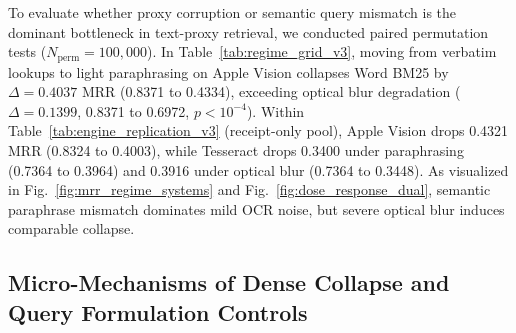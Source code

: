 To evaluate whether proxy corruption or semantic query mismatch is the dominant bottleneck in text-proxy retrieval, we conducted paired permutation tests ($N_{\text{perm}}=100{,}000$). In Table~\ref{tab:regime_grid_v3}, moving from verbatim lookups to light paraphrasing on Apple Vision collapses Word BM25 by $\Delta = 0.4037$ MRR (0.8371 to 0.4334), exceeding optical blur degradation ($\Delta = 0.1399$, 0.8371 to 0.6972, $p < 10^{-4}$). Within Table~\ref{tab:engine_replication_v3} (receipt-only pool), Apple Vision drops 0.4321 MRR (0.8324 to 0.4003), while Tesseract drops 0.3400 under paraphrasing (0.7364 to 0.3964) and 0.3916 under optical blur (0.7364 to 0.3448). As visualized in Fig.~\ref{fig:mrr_regime_systems} and Fig.~\ref{fig:dose_response_dual}, semantic paraphrase mismatch dominates mild OCR noise, but severe optical blur induces comparable collapse.

\subsection{Micro-Mechanisms of Dense Collapse and Query Formulation Controls}
\label{sec:mechanism_analysis}

